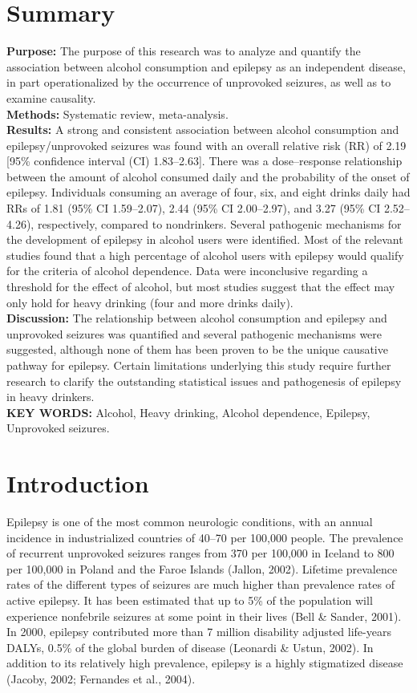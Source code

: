 \documentclass{article}
\begin{document}
\section*{Summary}
\textbf{Purpose:} The purpose of this research was to analyze and quantify the association between alcohol consumption and epilepsy as an independent disease, in part operationalized by the occurrence of unprovoked seizures, as well as to examine causality.\\
\textbf{Methods:} Systematic review, meta-analysis.\\
\textbf{Results:} A strong and consistent association between alcohol consumption and epilepsy/unprovoked seizures was found with an overall relative risk (RR) of 2.19 [95\% confidence interval (CI) 1.83–2.63]. There was a dose–response relationship between the amount of alcohol consumed daily and the probability of the onset of epilepsy. Individuals consuming an average of four, six, and eight drinks daily had RRs of 1.81 (95\% CI 1.59–2.07), 2.44 (95\% CI 2.00–2.97), and 3.27 (95\% CI 2.52–4.26), respectively, compared to nondrinkers. Several pathogenic mechanisms for the development of epilepsy in alcohol users were identified. Most of the relevant studies found that a high percentage of alcohol users with epilepsy would qualify for the criteria of alcohol dependence. Data were inconclusive regarding a threshold for the effect of alcohol, but most studies suggest that the effect may only hold for heavy drinking (four and more drinks daily).\\
\textbf{Discussion:} The relationship between alcohol consumption and epilepsy and unprovoked seizures was quantified and several pathogenic mechanisms were suggested, although none of them has been proven to be the unique causative pathway for epilepsy. Certain limitations underlying this study require further research to clarify the outstanding statistical issues and pathogenesis of epilepsy in heavy drinkers.\\
\textbf{KEY WORDS:} Alcohol, Heavy drinking, Alcohol dependence, Epilepsy, Unprovoked seizures.

\section*{Introduction}
Epilepsy is one of the most common neurologic conditions, with an annual incidence in industrialized countries of 40–70 per 100,000 people. The prevalence of recurrent unprovoked seizures ranges from 370 per 100,000 in Iceland to 800 per 100,000 in Poland and the Faroe Islands (Jallon, 2002). Lifetime prevalence rates of the different types of seizures are much higher than prevalence rates of active epilepsy. It has been estimated that up to 5\% of the population will experience nonfebrile seizures at some point in their lives (Bell \& Sander, 2001). In 2000, epilepsy contributed more than 7 million disability adjusted life-years DALYs, 0.5\% of the global burden of disease (Leonardi \& Ustun, 2002). In addition to its relatively high prevalence, epilepsy is a highly stigmatized disease (Jacoby, 2002; Fernandes et al., 2004).
\end{document}
